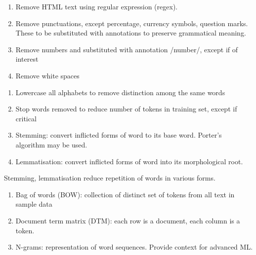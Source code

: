 \begin{method} 
\begin{enumerate}[label=\roman*.]
\setlength{\itemsep}{0pt}
\item Remove HTML text using regular expression (regex).
\item Remove punctuations, except percentage, currency symbols, question marks. These to be substituted with annotations to preserve grammatical meaning.
\item Remove numbers and substituted with annotation /number/, except if of interest
\item Remove white spaces
\end{enumerate}
\end{method}

\begin{method} 
\begin{enumerate}[label=\roman*.]
\setlength{\itemsep}{0pt}
\item Lowercase all alphabets to remove distinction among the same words
\item Stop words removed to reduce number of tokens in training set, except if critical
\item Stemming: convert inflicted forms of word to its base word. Porter’s algorithm may be used.
\item Lemmatisation: convert inflicted forms of word into its morphological root.
\end{enumerate}
Stemming, lemmatisation reduce repetition of words in various forms.
\end{method}

\begin{remark} 
\begin{enumerate}[label=\roman*.]
\setlength{\itemsep}{0pt}
\item Bag of words (BOW): collection of distinct set of tokens from all text in sample data
\item Document term matrix (DTM): each row is a document, each column is a token. 
\item N-grams: representation of word sequences. Provide context for advanced ML.
\end{enumerate}
\end{remark}


